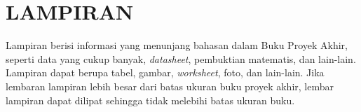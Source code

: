 \cleardoublepage
\appendix
{}

\chapter*{LAMPIRAN}
\renewcommand{\thesection}{\Alph{section}}

Lampiran berisi informasi yang menunjang bahasan dalam Buku Proyek Akhir, seperti data
yang cukup banyak, \textit{datasheet}, pembuktian matematis, dan lain-lain. Lampiran
dapat berupa tabel, gambar, \textit{worksheet}, foto, dan lain-lain. Jika lembaran
lampiran lebih besar dari batas ukuran buku proyek akhir, lembar lampiran dapat dilipat
sehingga tidak melebihi batas ukuran buku.


